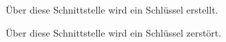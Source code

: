 





Über diese Schnittstelle wird ein Schlüssel erstellt.


Über diese Schnittstelle wird ein Schlüssel zerstört.


